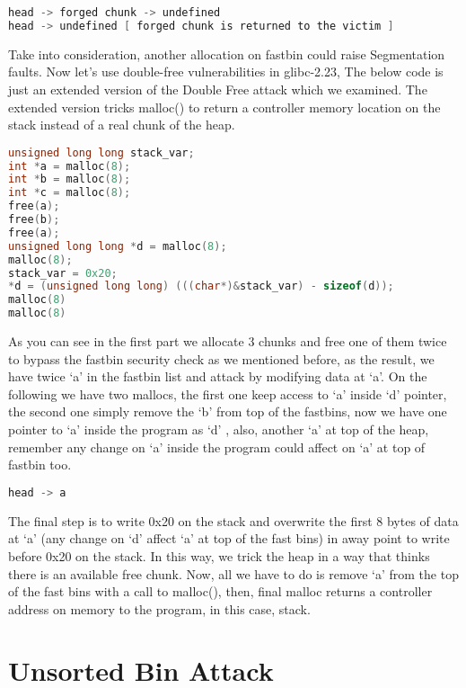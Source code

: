 \documentclass{masterthesis}
\newcommand*\libc{glibc}
\begin{document}
\begin{lstlisting}[language=c,frame=tlrb]
head -> forged chunk -> undefined
head -> undefined [ forged chunk is returned to the victim ]
\end{lstlisting}

Take into consideration, another allocation on fastbin could raise Segmentation faults.
Now let’s use double-free vulnerabilities in \libc{-2.23}, The below code is just an extended version of the Double Free attack which we examined. The extended version tricks malloc() to return a controller memory location on the stack instead of a real chunk of the heap. 

\begin{lstlisting}[language=c,frame=tlrb]
unsigned long long stack_var;
int *a = malloc(8);
int *b = malloc(8);
int *c = malloc(8);
free(a);
free(b);
free(a);
unsigned long long *d = malloc(8);
malloc(8);
stack_var = 0x20;
*d = (unsigned long long) (((char*)&stack_var) - sizeof(d));
malloc(8)
malloc(8)
\end{lstlisting}

As you can see in the first part we allocate 3 chunks and free one of them twice to bypass the fastbin security check as we mentioned before, as the result, we have twice ‘a’ in the fastbin list and attack by modifying data at ‘a’. On the following we have two mallocs, the first one keep access to ‘a’ inside ‘d’ pointer, the second one simply remove the ‘b’ from top of the fastbins, now we have one pointer to ‘a’ inside the program as ‘d’ , also, another ‘a’ at top of the heap, remember any change on ‘a’ inside the program could affect on ‘a’ at top of fastbin too.

\begin{lstlisting}[language=c,frame=tlrb]
head -> a 
\end{lstlisting}

The final step is to write 0x20 on the stack and overwrite the first 8 bytes of data at ‘a’ (any change on ‘d’ affect ‘a’ at top of the fast bins) in away point to write before 0x20 on the stack. In this way, we trick the heap in a way that thinks there is an available free chunk.
 Now, all we have to do is remove ‘a’ from the top of the fast bins with a call to malloc(), then, final malloc returns a controller address on memory to the program, in this case, stack.

\section{Unsorted Bin Attack}
\end{document}
